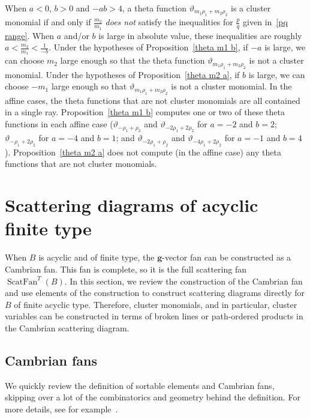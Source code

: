 \documentclass[ALCO,ThmDefs,Unicode,epreuves]{cedram}
\DeclareMathOperator{\ScatFan}{ScatFan}
\newcommand{\thet}{\vartheta}
\newcommand{\g}{\mathbf{g}}
\begin{document}
\begin{rema}\label{which thetas are cluster mons?}
When $a<0$, $b>0$ and $-ab>4$, a theta function $\thet_{m_1\rho_1+m_2\rho_2}$ is a cluster monomial if and only if $\frac{m_2}{m_1}$ \emph{does not} satisfy the inequalities for $\frac pq$ given in~\eqref{pq range}.
When $a$ and/or $b$ is large in absolute value, these inequalities are roughly $a<\frac{m_2}{m_1}<\frac1{-b}$.
Under the hypotheses of Proposition~\ref{theta m1 b}, if $-a$ is large, we can choose $m_2$ large enough so that the theta function $\thet_{m_1\rho_1+m_2\rho_2}$ is not a cluster monomial.
Under the hypotheses of Proposition~\ref{theta m2 a}, if $b$ is large, we can choose $-m_1$ large enough so that $\thet_{m_1\rho_1+m_2\rho_2}$ is not a cluster monomial.
In the affine cases, the theta functions that are not cluster monomials are all contained in a single ray.
Proposition~\ref{theta m1 b} computes one or two of these theta functions in each affine case 
($\thet_{-\rho_1+\rho_2}$ and $\thet_{-2\rho_1+2\rho_2}$ for $a=-2$ and $b=2$; 
$\thet_{-\rho_1+2\rho_2}$ for $a=-4$ and $b=1$; and 
$\thet_{-2\rho_1+\rho_2}$ and $\thet_{-4\rho_1+2\rho_2}$ for $a=-1$ and $b=4$).
Proposition~\ref{theta m2 a} does not compute (in the affine case) any theta functions that are not cluster monomials. 
\end{rema}

\section{Scattering diagrams of acyclic finite type}\label{camb sec}
When $B$ is acyclic and of finite type, the $\g$-vector fan can be constructed as a Cambrian fan. 
This fan is complete, so it is the full scattering fan $\ScatFan^T(B)$.
In this section, we review the construction of the Cambrian fan and use elements of the construction to construct scattering diagrams directly for $B$ of finite acyclic type.
Therefore, cluster monomials, and in particular, cluster variables can be constructed in terms of broken lines or path-ordered products in the Cambrian scattering diagram.

\subsection{Cambrian fans}\label{camb fan sec}
We quickly review the definition of sortable elements and Cambrian fans, skipping over a lot of the combinatorics and geometry behind the definition.
For more details, see for example~\cite{sortable,camb_fan,typefree}.
\end{document}
